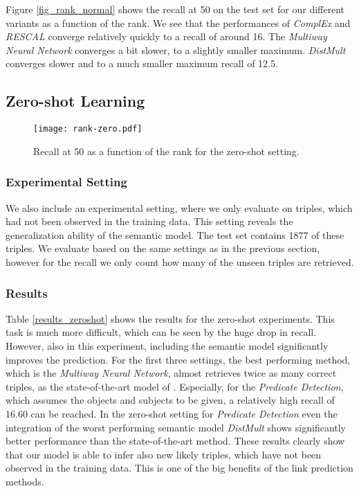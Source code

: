 \documentclass[runningheads,a4paper]{llncs}
\begin{document}
Figure \ref{fig_rank_normal} shows the recall at 50 on the test set for our different variants as a function of the rank. We see that the performances of \textit{ComplEx} and \textit{RESCAL} converge relatively quickly to a recall of around 16. The \textit{Multiway Neural Network} converges a bit slower, to a slightly smaller maximum. \textit{DistMult} converges slower and to a much smaller maximum recall of 12.5.

\subsection{Zero-shot Learning}


\begin{figure}[t]
\centering
    \texttt{[image: rank-zero.pdf]}
    \caption{Recall at 50 as a function of the rank for the zero-shot setting.}
    \label{fig_rank_zero}
\end{figure}




\subsubsection{Experimental Setting}

We also include an experimental setting, where we only evaluate on triples, which had not been observed in the training data. This setting reveals the generalization ability of the semantic model. The test set contains 1877 of these triples. We evaluate based on the same settings as in the previous section, however for the recall we only count how many of the unseen triples are retrieved.

\subsubsection{Results}
Table \ref{results_zeroshot} shows the results for the zero-shot experiments. This task is much more difficult, which can be seen by the huge drop in recall. However, also in this experiment, including the semantic model significantly improves the prediction. For the first three settings, the best performing method, which is the \textit{Multiway Neural Network}, almost retrieves twice as many correct triples, as the state-of-the-art model of \cite{visual}. Especially, for the \textit{Predicate Detection}, which assumes the objects and subjects to be given, a relatively high recall of 16.60 can be reached. In the zero-shot setting for \textit{Predicate Detection} even the integration of the worst performing semantic model \textit{DistMult} shows significantly better performance than the state-of-the-art method. These results clearly show that our model is able to infer also new likely triples, which have not been observed in the training data. This is one of the big benefits of the link prediction methods.
\end{document}
